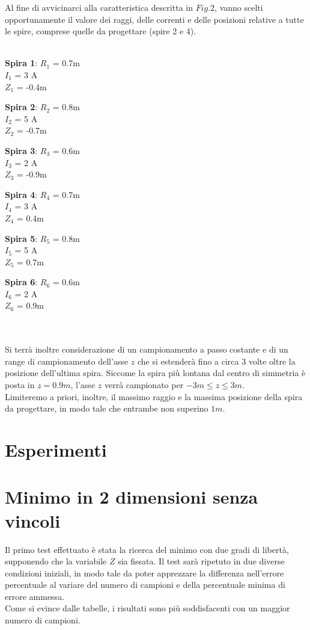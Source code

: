\documentclass[a4paper, 11pt]{article}
\begin{document}
Al fine di avvicinarci alla caratteristica descritta in $Fig. 2$, vanno scelti
opportunamente il valore dei raggi, delle correnti e delle posizioni relative a
tutte le spire, comprese quelle da progettare (spire 2 e 4). \\ \\
\centerline{ \textbf{Spira 1}: $R_{1}$ = 0.7m \\ $I_{1}$ = 3 A \\ $Z_{1}$ = -0.4m} 
\centerline{ \textbf{Spira 2}: $R_{2}$ = 0.8m \\ $I_{2}$ = 5 A \\ $Z_{2}$ = -0.7m}
\centerline{ \textbf{Spira 3}: $R_{3}$ = 0.6m \\ $I_{3}$ = 2 A \\ $Z_{3}$ = -0.9m}
\centerline{ \textbf{Spira 4}: $R_{4}$ = 0.7m \\ $I_{4}$ = 3 A \\ $Z_{4}$ = 0.4m}
\centerline{ \textbf{Spira 5}: $R_{5}$ = 0.8m \\ $I_{5}$ = 5 A \\ $Z_{5}$ = 0.7m}
\centerline{ \textbf{Spira 6}: $R_{6}$ = 0.6m \\ $I_{6}$ = 2 A \\ $Z_{6}$ = 0.9m}
\\ \\
\noindent
Si terrà inoltre considerazione di un campionamento a passo costante e di un
range di campionamento dell'asse $z$ che si estenderà fino a circa 3 volte oltre
la posizione dell'ultima spira. Siccome la spira più lontana dal centro di
simmetria è posta in $z = 0.9 m$, l'asse $z$ verrà campionato per $-3 m \le z \le
3 m$. \\
Limiteremo a priori, inoltre, il massimo raggio e la massima posizione della
spira da progettare, in modo tale che entrambe non superino $1 m$.

\section*{Esperimenti}
\section{Minimo in 2 dimensioni senza vincoli}

Il primo test effettuato è stata la ricerca del minimo con due gradi di libertà,
supponendo che la variabile $Z$ sia fissata. Il test sarà ripetuto in due
diverse condizioni iniziali, in modo tale da poter apprezzare la differenza
nell'errore percentuale al variare del numero di campioni e della percentuale
minima di errore ammessa. \\
Come si evince dalle tabelle, i risultati sono più soddisfacenti con un maggior
numero di campioni.
\end{document}
